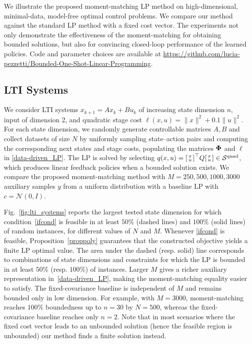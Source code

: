 \documentclass[journal,twoside,web]{ieeecolor}
\newcommand{\Sc}{\mathcal{S}}
\newcommand{\review}{\color{black}}
\begin{document}
We illustrate the proposed moment-matching LP method on high-dimensional, minimal-data, model-free optimal control problems. We compare our method against the {\review standard} LP method with a fixed cost vector. The experiments not only demonstrate the effectiveness of the moment-matching for obtaining bounded solutions, but also for convincing closed-loop performance of the learned policies.
Code and parameter choices are available at \href{https://github.com/lucia-pezzetti/Bounded-One-Shot-Linear-Programming}{https://github.com/lucia-pezzetti/Bounded-One-Shot-Linear-Programming}.

\subsection{LTI Systems}

We consider LTI systems $x_{k+1} = A x_k + B u_k$ of increasing state dimension $n$, input of dimension 2, and quadratic stage cost $\ell(x,u)=\|x\|^2+0.1\|u\|^2$. 
For each state dimension, we randomly generate controllable matrices $A,B$ and collect datasets of size $N$ by uniformly sampling state–action pairs and computing the corresponding next states and stage costs, populating the matrices $\bold \Phi$ and $\boldsymbol \ell$ in \eqref{data-driven_LP}. The LP is solved by selecting $q(x,u)= \begin{bsmallmatrix}
    x \\ u
\end{bsmallmatrix}^\top Q \begin{bsmallmatrix}
    x \\ u
\end{bsmallmatrix}\in\Sc^{\text{quad}}$, which produces linear feedback policies when a bounded solution exists. We compare the proposed moment-matching method with $M=250, 500, 1000, 3000$ auxiliary samples $y$ from a uniform distribution with a baseline LP with $c=\mathcal{N}(0,I)$.

Fig.~\ref{fig:lti_systems} reports {\review the largest tested state dimension for which condition~\eqref{ifcond} is feasible in at least $50\%$ (dashed lines) and $100\%$ (solid lines) of random instances, for different values of $N$ and $M$. Whenever \eqref{ifcond} is feasible, Proposition~\ref{proppoly} guarantees that the constructed objective yields a finite LP optimal value. The area under the dashed (resp. solid) line corresponds to combinations of state dimensions and constraints for which the LP is bounded in at least $50\%$ (resp. $100\%$) of instances. Larger $M$ gives a richer
auxiliary representation in~\eqref{data-driven_LP}, making the moment-matching equality easier to satisfy. The fixed-covariance baseline is independent of $M$ and remains bounded only in low dimension. For example, with $M=3000$, moment-matching reaches $100\%$ boundedness up
to $n=30$ by $N=500$, whereas the fixed-covariance baseline reaches only $n=2$.} {\review Note that in most scenarios where the fixed cost vector leads to an unbounded solution (hence the feasible region is unbounded) our method finds a finite solution instead.}
\end{document}
